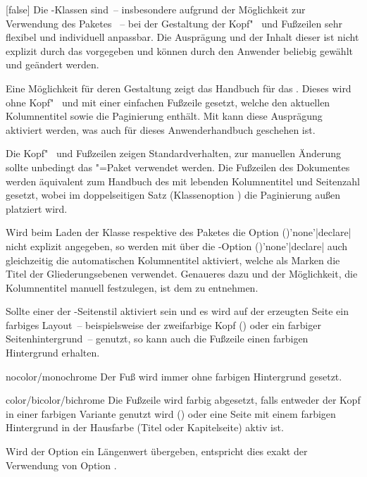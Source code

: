 \begin{Declaration*}{}
\begin{Declaration*}{}
\begin{Declaration*}{}
\begin{Declaration}[%
  v2.03!\Option{cdfoot=color}:farbiger Hintergrund der Fußzeile;%
  v2.03!\Option{cdfoot=\PValueName{Höhe}};%
]{}[false]
Die \TUDScript-Klassen sind~-- insbesondere aufgrund der Möglichkeit zur 
Verwendung des Paketes ~-- bei der Gestaltung der 
Kopf"~ und Fußzeilen sehr flexibel und individuell anpassbar. Die Ausprägung 
und der Inhalt dieser ist nicht explizit durch das \CD vorgegeben und können 
durch den Anwender beliebig gewählt und geändert werden. 

Eine Möglichkeit für deren Gestaltung zeigt das Handbuch für das \TUDCD. Dieses 
wird ohne Kopf"~ und mit einer einfachen Fußzeile gesetzt, welche den aktuellen 
Kolumnentitel sowie die Paginierung enthält. Mit  kann diese 
Ausprägung aktiviert werden, was auch für dieses Anwenderhandbuch geschehen ist.
%
\begin{values}{}
\itemfalse
  Die Kopf"~ und Fußzeilen zeigen Standardverhalten, zur manuellen Änderung 
  sollte unbedingt das \KOMAScript"=Paket  verwendet 
  werden.
\itemtrue*
  Die Fußzeilen des Dokumentes werden äquivalent zum Handbuch des \TUDCDs mit 
  lebenden Kolumnentitel und Seitenzahl gesetzt, wobei im doppelseitigen Satz 
  (Klassenoption ) die Paginierung außen platziert wird.
\end{values}
%
Wird beim Laden der Klasse respektive des Paketes  
die Option ()'none'|declare| nicht 
explizit angegeben, so werden mit  über die 
\KOMAScript-Option ()'none'|declare| 
auch gleichzeitig die automatischen Kolumnentitel aktiviert, welche als Marken 
die Titel der Gliederungsebenen verwendet. Genaueres dazu und der Möglichkeit, 
die Kolumnentitel manuell festzulegen, ist dem \scrguide zu entnehmen.

Sollte einer der -Seitenstil aktiviert sein und es wird 
auf der erzeugten Seite ein farbiges Layout~--  beispielsweise der zweifarbige 
Kopf () oder ein farbiger Seitenhintergrund~-- genutzt, 
so kann auch die Fußzeile einen farbigen Hintergrund erhalten.
%
\begin{values}{}
\item[nocolor/monochrome]
  Der Fuß wird immer ohne farbigen Hintergrund gesetzt.
\item[color/bicolor/bichrome]
  Die Fußzeile wird farbig abgesetzt, falls entweder der Kopf in einer farbigen
  Variante genutzt wird () oder eine Seite mit einem 
  farbigen Hintergrund in der Hausfarbe (Titel oder Kapitelseite) aktiv ist.
\item[\PValueName{Höhe}]
  Wird der Option ein Längenwert übergeben, entspricht dies exakt der 
  Verwendung von Option .
\end{values}
\end{Declaration}


\end{Declaration*}
\end{Declaration*}
\end{Declaration*}
